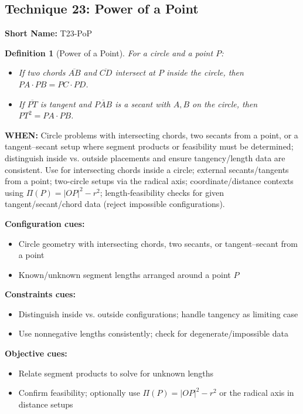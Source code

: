 \documentclass[12pt]{article}
\newtheorem{definition}{Definition}[section]
\begin{document}
\subsection{Technique 23: Power of a Point}
\textbf{Short Name:} T23-PoP

\begin{definition}[Power of a Point]
For a circle and a point $P$:
\begin{itemize}
    \item If two chords $\overline{AB}$ and $\overline{CD}$ intersect at $P$ inside the circle, then $PA\cdot PB = PC\cdot PD$.
    \item If $\overline{PT}$ is tangent and $\overline{PAB}$ is a secant with $A,B$ on the circle, then $PT^2 = PA\cdot PB$.
\end{itemize}
\end{definition}

\textbf{WHEN:} Circle problems with intersecting chords, two secants from a point, or a tangent–secant setup where segment products or feasibility must be determined; distinguish inside vs. outside placements and ensure tangency/length data are consistent. Use for intersecting chords inside a circle; external secants/tangents from a point; two-circle setups via the radical axis; coordinate/distance contexts using $\Pi(P)=|OP|^2-r^2$; length-feasibility checks for given tangent/secant/chord data (reject impossible configurations).

\textbf{Configuration cues:}
\begin{itemize}
    \item Circle geometry with intersecting chords, two secants, or tangent–secant from a point
    \item Known/unknown segment lengths arranged around a point $P$
\end{itemize}

\textbf{Constraints cues:}
\begin{itemize}
    \item Distinguish inside vs. outside configurations; handle tangency as limiting case
    \item Use nonnegative lengths consistently; check for degenerate/impossible data
\end{itemize}

\textbf{Objective cues:}
\begin{itemize}
    \item Relate segment products to solve for unknown lengths
    \item Confirm feasibility; optionally use $\Pi(P)=|OP|^2-r^2$ or the radical axis in distance setups
\end{itemize}
\end{document}
